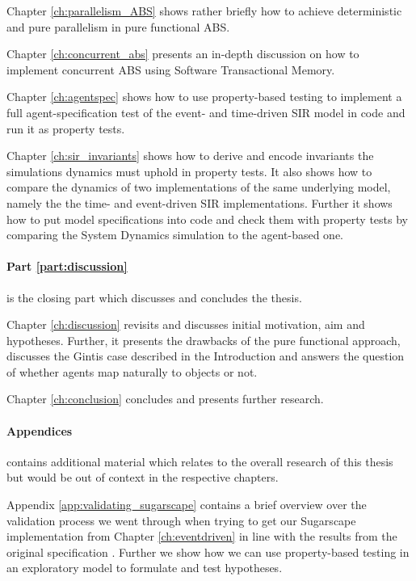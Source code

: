\medskip

Chapter \ref{ch:parallelism_ABS} shows rather briefly how to achieve deterministic and pure parallelism in pure functional ABS. 

\medskip

Chapter \ref{ch:concurrent_abs} presents an in-depth discussion on how to implement concurrent ABS using Software Transactional Memory.

\medskip

Chapter \ref{ch:agentspec} shows how to use property-based testing to implement a full agent-specification test of the event- and time-driven SIR model in code and run it as property tests.

\medskip

Chapter \ref{ch:sir_invariants} shows how to derive and encode invariants the simulations dynamics must uphold in property tests. It also shows how to compare the dynamics of two implementations of the same underlying model, namely the the time- and event-driven SIR implementations. Further it shows how to put model specifications into code and check them with property tests by comparing the System Dynamics simulation to the agent-based one.

\medskip

\paragraph{Part \ref{part:discussion}} is the closing part which discusses and concludes the thesis. 
\medskip

Chapter \ref{ch:discussion} revisits and discusses initial motivation, aim and hypotheses. Further, it presents the drawbacks of the pure functional approach, discusses the Gintis case described in the Introduction and answers the question of whether agents map naturally to objects or not.

\medskip

Chapter \ref{ch:conclusion} concludes and presents further research.

\paragraph{Appendices} contains additional material which relates to the overall research of this thesis but would be out of context in the respective chapters.
\medskip

Appendix \ref{app:validating_sugarscape} contains a brief overview over the validation process we went through when trying to get our Sugarscape implementation from Chapter \ref{ch:eventdriven} in line with the results from the original specification \cite{epstein_growing_1996}. Further we show how we can use property-based testing in an exploratory model to formulate and test hypotheses.

